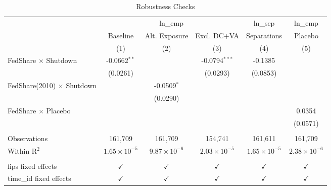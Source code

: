 
\begin{table}[htbp]
   \caption{\label{tab:robustness} Robustness Checks}
   \bigskip
   \centering
   \begin{adjustbox}{max width=\textwidth}
   \begin{tabular}{lccccc}
      \toprule
       & \multicolumn{3}{c}{ln\_emp} & ln\_sep & ln\_emp\\
                                        & Baseline              & Alt. Exposure         & Excl. DC+VA           & Separations           & Placebo \\   
                                        & (1)                   & (2)                   & (3)                   & (4)                   & (5)\\  
      \midrule 
      FedShare $\times$ Shutdown        & -0.0662$^{**}$        &                       & -0.0794$^{***}$       & -0.1385               &   \\   
                                        & (0.0261)              &                       & (0.0293)              & (0.0853)              &   \\   
      FedShare(2010) $\times$ Shutdown  &                       & -0.0509$^{*}$         &                       &                       &   \\   
                                        &                       & (0.0290)              &                       &                       &   \\   
      FedShare $\times$ Placebo         &                       &                       &                       &                       & 0.0354\\   
                                        &                       &                       &                       &                       & (0.0571)\\   
       \\
      Observations                      & 161,709               & 161,709               & 154,741               & 161,611               & 161,709\\  
      Within R$^2$                      & $1.65\times 10^{-5}$  & $9.87\times 10^{-6}$  & $2.03\times 10^{-5}$  & $1.65\times 10^{-5}$  & $2.38\times 10^{-6}$\\   
       \\
      fips fixed effects                & $\checkmark$          & $\checkmark$          & $\checkmark$          & $\checkmark$          & $\checkmark$\\   
      time\_id fixed effects            & $\checkmark$          & $\checkmark$          & $\checkmark$          & $\checkmark$          & $\checkmark$\\   
      \bottomrule
   \end{tabular}
   \end{adjustbox}
   

\end{table}
